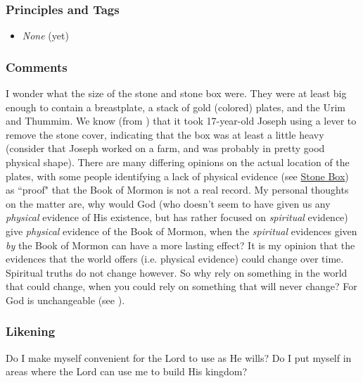 \documentclass[12pt]{report}
\begin{document}
\subsubsection{Principles and Tags\label{js:principles18}}
\begin{itemize}
\item \index{}\emph{None} (yet)
\end{itemize}

\subsubsection{Comments\label{js:comments18}}
I wonder what the size of the stone and stone box were.  They were at least big enough to contain a breastplate, a stack of gold (colored) plates, and the Urim and Thummim.  We know (from ) that it took 17-year-old Joseph using a lever to remove the stone cover, indicating that the box was at least a little heavy (consider that Joseph worked on a farm, and was probably in pretty good physical shape).  There are many differing opinions on the actual location of the plates, with some people identifying a lack of physical evidence (see \href{http://www.mormonthink.com/glossary/stone-box.htm}{Stone Box}) as ``proof" that the Book of Mormon is not a real record.  My personal thoughts on the matter are, why would God (who doesn't seem to have given us any \emph{physical} evidence of His existence, but has rather focused on \emph{spiritual} evidence) give \emph{physical} evidence of the Book of Mormon, when the \emph{spiritual} evidences given \emph{by} the Book of Mormon can have a more lasting effect?  It is my opinion that the evidences that the world offers (i.e. physical evidence) could change over time.  Spiritual truths do not change however.  So why rely on something in the world that could change, when you could rely on something that will never change? For God is unchangeable (see ).

\subsubsection{Likening\label{js:likening18}}
Do I make myself convenient for the Lord to use as He wills?  Do I put myself in areas where the Lord can use me to build His kingdom?
\end{document}
